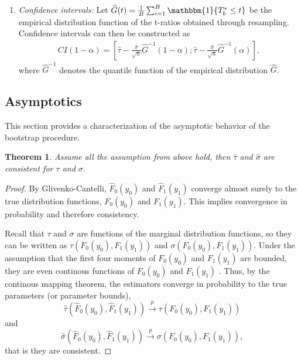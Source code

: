 \documentclass[aodsor,preprint]{imsart}
\numberwithin{equation}{section}
\theoremstyle{plain}
\newtheorem{thm}{Theorem}[section]
\newcommand{\ind}{\mathbbm{1}} %
\begin{document}
\begin{enumerate}
	\item \textit{Confidence intervals:} Let $\widehat{G}(t) = \frac{1}{B} \sum_{i=1}^{B} \ind\{T_b^* \leq t\}$ be the empirical distribution function of the t-ratios obtained through resampling. Confidence intervals can then be constructed as 
	\begin{align} \label{CI}
		CI(1-\alpha) = \left[ \widehat{\tau} - \frac{\widehat{\sigma}}{\sqrt{n}} \widehat{G}^{-1}(1-\alpha); \widehat{\tau} - \frac{\widehat{\sigma}}{\sqrt{n}} \widehat{G}^{-1}(\alpha)  \right],
	\end{align}
	where $\widehat{G}^{-1}$ denotes the quantile function of the empirical distribution $\widehat{G}$.
	
\end{enumerate}

\subsection{Asymptotics}

This section provides a characterization of the asymptotic behavior of the bootstrap procedure.

\begin{thm}
	Assume all the assumption from above hold, then $\widehat{\tau}$ and $\widehat{\sigma}$ are consistent for $\tau$ and $\sigma$.
\end{thm}

\begin{proof}
	By Glivenko-Cantelli, $\widehat{F}_0(y_0)$ and $\widehat{F}_1(y_1)$ converge almost surely to the true distribution functions, $F_0(y_0)$ and $F_1(y_1)$. This implies convergence in probability and therefore consistency.
	
	Recall that $\tau$ and $\sigma$ are functions of the marginal distribution functions, so they can be written as $\tau(F_0(y_0), F_1(y_1))$ and $\sigma(F_0(y_0), F_1(y_1))$. Under the assumption that the first four moments of $F_0(y_0)$ and $F_1(y_1)$ are bounded, they are  even continous functions of $F_0(y_0)$ and $F_1(y_1)$ \citep[see][section 5.1]{Imbens_2021}. Thus, by the continous mapping theorem, the estimators converge in probability to the true parameters (or parameter bounds),
	$$
	\widehat{\tau}(\widehat{F}_0(y_0), \widehat{F}_1(y_1)) \overset{p}{\to} \tau(F_0(y_0), F_1(y_1))
	$$
	and
	$$
	\widehat{\sigma}(\widehat{F}_0(y_0), \widehat{F}_1(y_1)) \overset{p}{\to} \sigma(F_0(y_0), F_1(y_1)),
	$$
	that is they are consistent.
\end{proof}
\end{document}
